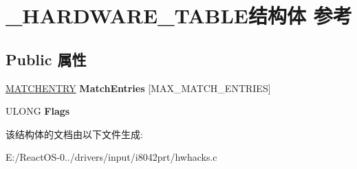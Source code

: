 \hypertarget{struct___h_a_r_d_w_a_r_e___t_a_b_l_e}{}\section{\+\_\+\+H\+A\+R\+D\+W\+A\+R\+E\+\_\+\+T\+A\+B\+L\+E结构体 参考}
\label{struct___h_a_r_d_w_a_r_e___t_a_b_l_e}
\subsection*{Public 属性}
\begin{DoxyCompactItemize}
\item 
\mbox{\label{struct___h_a_r_d_w_a_r_e___t_a_b_l_e_af142fae5f3b55a70197cb42489f0544f}} 
\hyperlink{struct___m_a_t_c_h_e_n_t_r_y}{M\+A\+T\+C\+H\+E\+N\+T\+RY} {\bfseries Match\+Entries} \mbox{[}M\+A\+X\+\_\+\+M\+A\+T\+C\+H\+\_\+\+E\+N\+T\+R\+I\+ES\mbox{]}
\item 
\mbox{\label{struct___h_a_r_d_w_a_r_e___t_a_b_l_e_aeae48e979076f7b76e97ca2ce772a5f9}} 
U\+L\+O\+NG {\bfseries Flags}
\end{DoxyCompactItemize}


该结构体的文档由以下文件生成\+:\begin{DoxyCompactItemize}
\item 
E\+:/\+React\+O\+S-\/0../drivers/input/i8042prt/hwhacks.\+c\end{DoxyCompactItemize}
